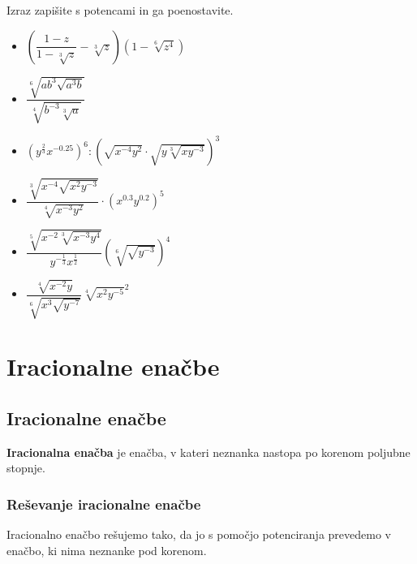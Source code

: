         
            \begin{naloga}
                Izraz zapišite s potencami in ga poenostavite.
                \begin{itemize}
                    \item $\displaystyle \left(\dfrac{1-z}{1-\sqrt[3]{z}}-\sqrt[3]{z}\right)\left(1-\sqrt[6]{z^4}\right)$ 
                    \item $\displaystyle \dfrac{\sqrt[6]{ab^3\sqrt{a^3b}}}{\sqrt[4]{b^{-3}\sqrt[3]{a}}}$ 
                    \item $\displaystyle \left(y^\frac{2}{3}x^{-0.25}\right)^6 :\left(\sqrt{x^{-4}y^2}\cdot\sqrt{y\sqrt[3]{xy^{-3}}}\right)^3 $ 
                    \item $\displaystyle \dfrac{\sqrt[3]{x^{-4}\sqrt{x^2y^{-3}}}}{\sqrt[4]{x^{-3}y^2}}\cdot\left(x^{0.3}y^{0.2}\right)^5 $ 
                    \item $\displaystyle \dfrac{\sqrt[5]{x^{-2}\sqrt[3]{x^{-3}y^4}}}{y^{-\frac{1}{3}}x^\frac{1}{2}}\left(\sqrt[6]{\sqrt{y^{-3}}}\right)^4 $ 
                    \item $\displaystyle \dfrac{\sqrt[4]{x^{-2}y}}{\sqrt[6]{x^3\sqrt{y^{-7}}}}\sqrt[4]{x^2y^{-5}}^2 $ 
                \end{itemize}
            \end{naloga}
        





            \newpage

    \section{Iracionalne enačbe}

        
            \subsection{Iracionalne enačbe}

                \textbf{Iracionalna enačba} je enačba, v kateri neznanka nastopa po korenom poljubne stopnje.
            

            \subsubsection*{Reševanje iracionalne enačbe}
                Iracionalno enačbo rešujemo tako, da jo s pomočjo potenciranja prevedemo v enačbo, ki nima neznanke pod korenom.

